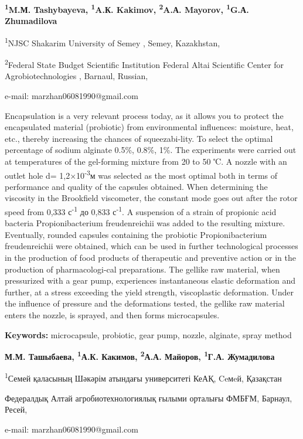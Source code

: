 \begin{center}

{\bfseries \textsuperscript{1}M.М. Tashybayeva\envelope,
\textsuperscript{1}A.К. Kakimov, \textsuperscript{2}A.А. Mayorov,
\textsuperscript{1}G.А. Zhumadilova}

\textsuperscript{1}NJSC Shakarim University of Semey , Semey,
Kazakhstan,

\textsuperscript{2}Federal State Budget Scientific Institution Federal
Altai Scientific Center for Agrobiotechnologies , Barnaul, Russian,

e-mail: marzhan06081990@gmail.com
\end{center}

Encapsulation is a very relevant process today, as it allows you to
protect the encapsulated material (probiotic) from environmental
influences: moisture, heat, etc., thereby increasing the chances of
squeezabi-lity. To select the optimal percentage of sodium alginate
0.5\%, 0.8\%, 1\%. The experiments were carried out at temperatures of
the gel-forming mixture from 20 to 50 ℃. A nozzle with an outlet hole d=
1,2×10\textsuperscript{-3}м was selected as the most optimal both in
terms of performance and quality of the capsules obtained. When
determining the viscosity in the Brookfield viscometer, the constant
mode goes out after the rotor speed from 0,333 с\textsuperscript{-1} до
0,833 с\textsuperscript{-1}. A suspension of a strain of propionic acid
bacteria Propionibacterium freudenreichii was added to the resulting
mixture. Eventually, rounded capsules containing the probiotic
Propionibacterium freudenreichii were obtained, which can be used in
further technological processes in the production of food products of
therapeutic and preventive action or in the production of
pharmacologi-cal preparations. The gellike raw material, when pressurized
with a gear pump, experiences instantaneous elastic deformation and
further, at a stress exceeding the yield strength, viscoplastic
deformation. Under the influence of pressure and the deformations
tested, the gellike raw material enters the nozzle, is sprayed, and then
forms microcapsules.

{\bfseries Keywords:} microcapsule, probiotic, gear pump, nozzle,
alginate, spray method

\begin{center}

{\bfseries М.М. Ташыбаева\envelope, \textsuperscript{1}А.К.
Какимов, \textsuperscript{2}А.А. Майоров, \textsuperscript{1}Г.А.
Жумадилова}

\textsuperscript{1}Семей қаласының Шәкәрім атындағы университеті КеАҚ, Ceмeй, Қазақстан

Федералдық Алтай агробиотехнологиялық ғылыми орталығы ФМБҒМ, Барнаул, Ресей,

e-mail: marzhan06081990@gmail.com
\end{center}

